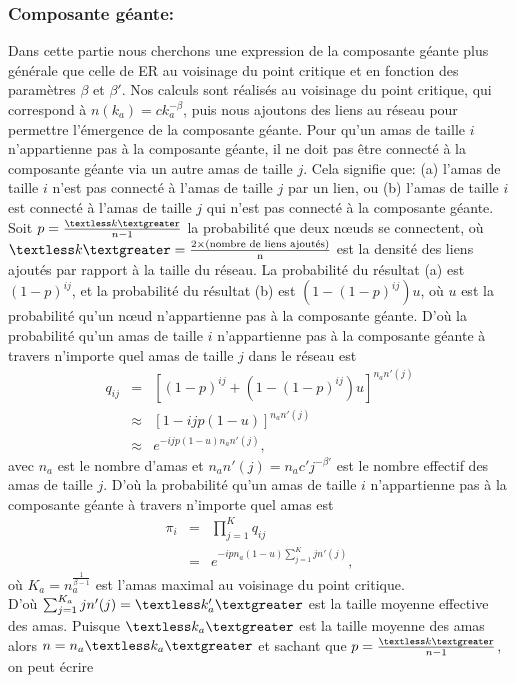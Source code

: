 \subsubsection{Composante géante:}
Dans cette partie nous cherchons une expression de la composante géante plus générale que celle de ER au voisinage du point critique et en fonction des paramètres $\beta$ et $\beta'$.
Nos calculs sont réalisés au voisinage du point critique, qui correspond à $n(k_a)=ck_a^{-\beta}$, puis nous ajoutons des liens au réseau pour permettre l'émergence de la composante géante.
Pour qu'un amas de taille $i$ n'appartienne pas à la composante géante, il ne doit pas être connecté à la composante géante via un autre amas de taille $j$. Cela signifie que: (a) l'amas de taille $i$ n'est pas connecté à l'amas de taille $j$ par un lien, ou (b) l'amas  de taille $i$ est connecté à l'amas de taille $j$ qui n'est pas connecté à la composante géante.\\
Soit $p=\frac{\km}{n-1}$ la probabilité que deux nœuds se connectent, où 
$\km=\frac{2\times\text{(nombre de liens ajoutés)}}{\text{n}}$ est la densité des liens ajoutés par rapport à la taille du réseau.
La probabilité du résultat (a) est $(1-p)^{ij}$, et la probabilité du résultat (b) est $(1-(1-p)^{ij})u$, où $u$ est la probabilité qu'un nœud n'appartienne pas à la composante géante. D'où la probabilité qu'un amas de taille $i$ n'appartienne pas à la composante géante à travers n'importe quel amas de taille $j$ dans le réseau est
\begin{eqnarray}
q_{ij}&=&[(1-p)^{ij}+(1-(1-p)^{ij})u]^{n_an'(j)}\nonumber\\
&\approx&[1-ijp(1-u)]^{n_an'(j)}\nonumber\\
&\approx&e^{-ijp(1-u)n_an'(j)},
\end{eqnarray}
avec $n_a$ est le nombre d'amas et $n_an'(j)=n_ac'j^{-\beta'}$ est le nombre effectif des amas de taille $j$.
D'où la probabilité qu'un amas de taille $i$ n'appartienne pas à la composante géante à travers n'importe quel amas est
\begin{eqnarray}
\pi_{i}&=&\prod_{j=1}^{K}q_{ij}\nonumber\\
&=&e^{-ipn_a(1-u)\sum_{j=1}^{K}jn'(j)},
\end{eqnarray}
où $K_a=n_a^{\frac{1}{\beta-1}}$ est l'amas maximal au voisinage du point critique.\\ D'où $\sum_{j=1}^{K_a}jn'(j)=\kmap$ est la taille moyenne effective des amas. Puisque $\kma$ est la taille moyenne des amas alors $n=n_a\kma$ et sachant que $p=\frac{\km}{n-1}$, on peut écrire
